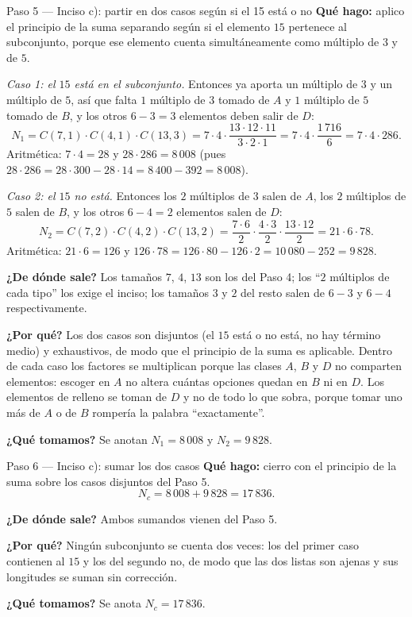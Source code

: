 \documentclass[11pt]{article}
\begin{document}
\begin{paso}{Paso 5 --- Inciso c): partir en dos casos según si el 15 está o no}
\textbf{Qué hago:} aplico el principio de la suma separando según si el elemento $15$ pertenece al subconjunto, porque ese elemento cuenta simultáneamente como múltiplo de $3$ y de $5$.

\emph{Caso 1: el $15$ está en el subconjunto.} Entonces ya aporta un múltiplo de $3$ y un múltiplo de $5$, así que falta $1$ múltiplo de $3$ tomado de $A$ y $1$ múltiplo de $5$ tomado de $B$, y los otros $6-3=3$ elementos deben salir de $D$:
\[
  N_1=C(7,1)\cdot C(4,1)\cdot C(13,3)
     =7\cdot 4\cdot \frac{13\cdot 12\cdot 11}{3\cdot 2\cdot 1}
     =7\cdot 4\cdot \frac{1\,716}{6}
     =7\cdot 4\cdot 286 .
\]
Aritmética: $7\cdot 4=28$ y $28\cdot 286=8\,008$ (pues $28\cdot 286 = 28\cdot 300 - 28\cdot 14 = 8\,400-392=8\,008$).

\emph{Caso 2: el $15$ no está.} Entonces los $2$ múltiplos de $3$ salen de $A$, los $2$ múltiplos de $5$ salen de $B$, y los otros $6-4=2$ elementos salen de $D$:
\[
  N_2=C(7,2)\cdot C(4,2)\cdot C(13,2)
     =\frac{7\cdot 6}{2}\cdot\frac{4\cdot 3}{2}\cdot\frac{13\cdot 12}{2}
     =21\cdot 6\cdot 78 .
\]
Aritmética: $21\cdot 6=126$ y $126\cdot 78 = 126\cdot 80 - 126\cdot 2 = 10\,080-252=9\,828$.

\textbf{¿De dónde sale?} Los tamaños $7$, $4$, $13$ son los del Paso 4; los ``$2$ múltiplos de cada tipo'' los exige el inciso; los tamaños $3$ y $2$ del resto salen de $6-3$ y $6-4$ respectivamente.

\textbf{¿Por qué?} Los dos casos son disjuntos (el $15$ está o no está, no hay término medio) y exhaustivos, de modo que el principio de la suma es aplicable. Dentro de cada caso los factores se multiplican porque las clases $A$, $B$ y $D$ no comparten elementos: escoger en $A$ no altera cuántas opciones quedan en $B$ ni en $D$. Los elementos de relleno se toman de $D$ y no de todo lo que sobra, porque tomar uno más de $A$ o de $B$ rompería la palabra ``exactamente''.

\textbf{¿Qué tomamos?} Se anotan $N_1=8\,008$ y $N_2=9\,828$.
\end{paso}

\begin{paso}{Paso 6 --- Inciso c): sumar los dos casos}
\textbf{Qué hago:} cierro con el principio de la suma sobre los casos disjuntos del Paso 5.
\[
  N_c = 8\,008 + 9\,828 = 17\,836 .
\]

\textbf{¿De dónde sale?} Ambos sumandos vienen del Paso 5.

\textbf{¿Por qué?} Ningún subconjunto se cuenta dos veces: los del primer caso contienen al $15$ y los del segundo no, de modo que las dos listas son ajenas y sus longitudes se suman sin corrección.

\textbf{¿Qué tomamos?} Se anota $N_c=17\,836$.
\end{paso}
\end{document}
